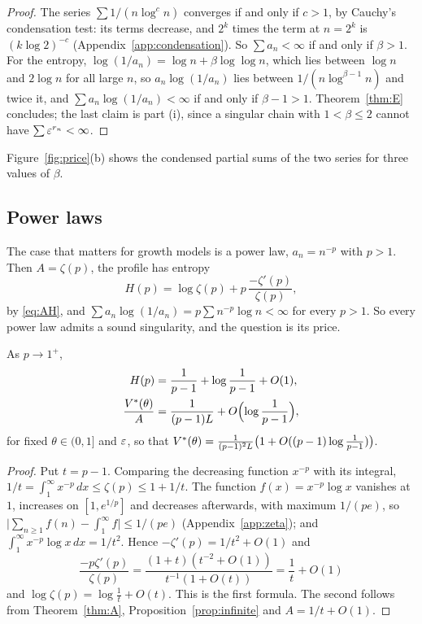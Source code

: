 \begin{proof}
The series $\sum1/(n\log^{c}n)$ converges if and only if $c>1$, by Cauchy's condensation test: its terms decrease, and $2^{k}$ times the term at $n=2^{k}$ is $(k\log2)^{-c}$ (Appendix~\ref{app:condensation}). So $\sum a_{n}<\infty$ if and only if $\beta>1$. For the entropy, $\log(1/a_{n})=\log n+\beta\log\log n$, which lies between $\log n$ and $2\log n$ for all large $n$, so $a_{n}\log(1/a_{n})$ lies between $1/(n\log^{\beta-1}n)$ and twice it, and $\sum a_{n}\log(1/a_{n})<\infty$ if and only if $\beta-1>1$. Theorem~\ref{thm:E} concludes; the last claim is part (i), since a singular chain with $1<\beta\le2$ cannot have $\sum\varepsilon^{r_{n}}<\infty$.
\end{proof}

Figure~\ref{fig:price}(b) shows the condensed partial sums of the two series for three values of $\beta$.

\subsection{Power laws}

The case that matters for growth models is a power law, $a_{n}=n^{-p}$ with $p>1$. Then $A=\zeta(p)$, the profile has entropy
\[
H(p)=\log\zeta(p)+p\,\frac{-\zeta'(p)}{\zeta(p)},
\]
by \eqref{eq:AH}, and $\sum a_{n}\log(1/a_{n})=p\sum n^{-p}\log n<\infty$ for every $p>1$. So every power law admits a sound singularity, and the question is its price.

\begin{proposition}\label{prop:powerlaw}
As $p\to1^{+}$,
\[
\begin{aligned}
H(p)&=\frac1{p-1}+\log\frac1{p-1}+O(1),\\
\frac{V^{*}(\theta)}{A}&=\frac1{(p-1)L}+O\Bigl(\log\frac1{p-1}\Bigr),
\end{aligned}
\]
for fixed $\theta\in(0,1]$ and $\varepsilon$, so that $V^{*}(\theta)=\frac{1}{(p-1)^{2}L}\bigl(1+O((p-1)\log\frac1{p-1})\bigr)$.
\end{proposition}

\begin{proof}
Put $t=p-1$. Comparing the decreasing function $x^{-p}$ with its integral, $1/t=\int_{1}^{\infty}x^{-p}\,dx\le\zeta(p)\le1+1/t$. The function $f(x)=x^{-p}\log x$ vanishes at $1$, increases on $[1,e^{1/p}]$ and decreases afterwards, with maximum $1/(pe)$, so $\bigl|\sum_{n\ge1}f(n)-\int_{1}^{\infty}f\bigr|\le1/(pe)$ (Appendix~\ref{app:zeta}); and $\int_{1}^{\infty}x^{-p}\log x\,dx=1/t^{2}$. Hence $-\zeta'(p)=1/t^{2}+O(1)$ and
\[
\frac{-p\zeta'(p)}{\zeta(p)}=\frac{(1+t)(t^{-2}+O(1))}{t^{-1}(1+O(t))}=\frac1t+O(1)
\]
and $\log\zeta(p)=\log\frac1t+O(t)$.
This is the first formula. The second follows from Theorem~\ref{thm:A}, Proposition~\ref{prop:infinite} and $A=1/t+O(1)$.
\end{proof}

